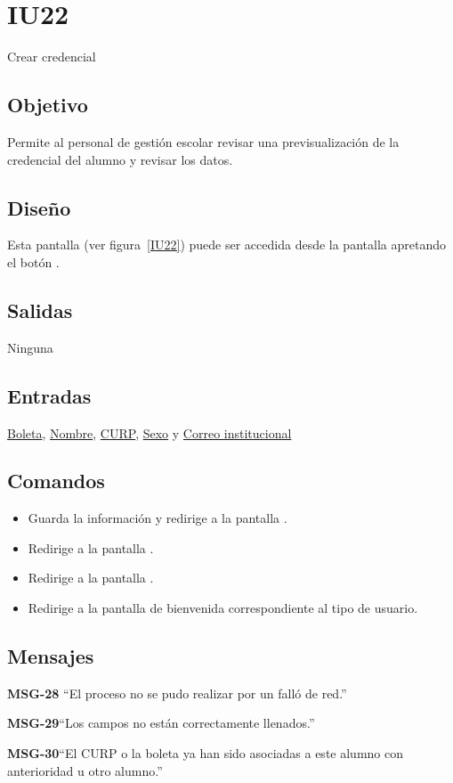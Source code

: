 
\section{IU22} {Crear credencial}

\subsection{Objetivo}
   Permite al personal de gestión escolar revisar una previsualización de la credencial del alumno y revisar los datos.
\subsection{Diseño}
    Esta pantalla  (ver figura~\ref{IU22}) puede ser accedida desde la pantalla  apretando el botón .


\subsection{Salidas}
Ninguna
\subsection{Entradas}
    \hyperlink{Alumno.Boleta}{Boleta}, \hyperlink{Alumno.Nombre}{Nombre}, \hyperlink{Alumno.CURP}{CURP}, \hyperlink{Alumno.Sexo}{Sexo} y \hyperlink{Alumno.Correo institucional}{Correo institucional}
\subsection{Comandos}
\begin{itemize}
\item {} Guarda la información y redirige a la pantalla .
    \item {} Redirige a la pantalla .
    \item {} Redirige a la pantalla .
    \item {} Redirige a la pantalla de bienvenida correspondiente al tipo de usuario.
    
\end{itemize}

\subsection{Mensajes}

\begin{Citemize}
    \item {\bf MSG-28}  ``El proceso no se pudo realizar por un falló de red.''
    \item {\bf MSG-29}{``Los campos no están correctamente llenados.''}
    \item {\bf MSG-30}{``El CURP o la boleta ya han sido asociadas a este alumno con anterioridad u otro alumno.''}
\end{Citemize}
